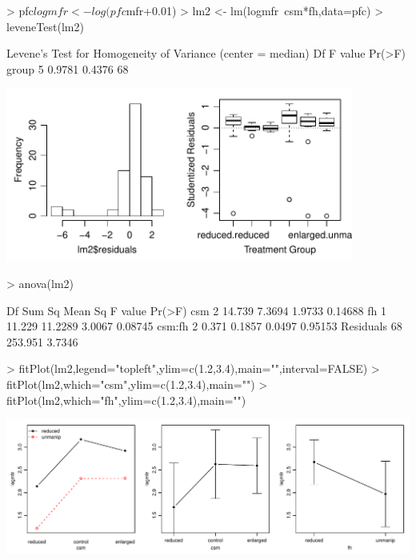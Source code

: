 \documentclass[a4paper]{article}
\begin{document}
\begin{Schunk}
\begin{Sinput}
> pfc$logmfr <- log(pfc$mfr+0.01)
> lm2 <- lm(logmfr~csm*fh,data=pfc)
> leveneTest(lm2)
\end{Sinput}
\begin{Soutput}
Levene's Test for Homogeneity of Variance (center = median)
      Df F value Pr(>F)
group  5  0.9781 0.4376
      68               
\end{Soutput}
\end{Schunk}
\includegraphics[width=4.5in]{Figs/q2-trResids.PDF}

\begin{Schunk}
\begin{Sinput}
> anova(lm2)
\end{Sinput}
\end{Schunk}
\begin{Schunk}
\begin{Soutput}
          Df  Sum Sq Mean Sq F value  Pr(>F)
csm        2  14.739  7.3694  1.9733 0.14688
fh         1  11.229 11.2289  3.0067 0.08745
csm:fh     2   0.371  0.1857  0.0497 0.95153
Residuals 68 253.951  3.7346                
\end{Soutput}
\end{Schunk}


\begin{Schunk}
\begin{Sinput}
> fitPlot(lm2,legend="topleft",ylim=c(1.2,3.4),main="",interval=FALSE)
> fitPlot(lm2,which="csm",ylim=c(1.2,3.4),main="")
> fitPlot(lm2,which="fh",ylim=c(1.2,3.4),main="")
\end{Sinput}
\end{Schunk}
\includegraphics[width=7in]{Figs/q2-trFits.PDF}
\end{document}
